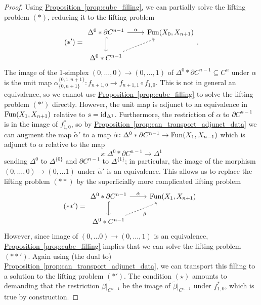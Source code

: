 \documentclass[main.tex]{subfiles}
\begin{document}
\begin{proof}
  Using \hyperref[prop:cube_filling]{Proposition~\ref*{prop:cube_filling}}, we can partially solve the lifting problem $(*)$, reducing it to the lifting problem
  \begin{equation*}
    (*') =
    \begin{tikzcd}
      \Delta^{0} \ast \partial C^{n-1}
      \arrow[r, "\alpha"]
      \arrow[d, hook]
      & \Fun(X_{0}, X_{n+1})
      \\
      \Delta^{0} \ast C^{n-1}
      \arrow[ur, dashed]
    \end{tikzcd}.
  \end{equation*}
  The image of the 1-simplex $(0, \ldots, 0) \to (0, \ldots, 1)$ of $\Delta^{0} \ast \partial C^{n-1} \subseteq C^{n}$ under $\alpha$ is the unit map $\alpha^{\{0, 1, n+1\}}_{\{0, n+1\}}\colon f_{n+1, 0} \to f_{n+1, 1} \circ f_{1, 0}$. This is not in general an equivalence, so we cannot use \hyperref[prop:cube_filling]{Proposition~\ref*{prop:cube_filling}} to solve the lifting problem $(*')$ directly. However, the unit map is adjunct to an equivalence in $\mathrm{Fun}(X_{1}, X_{n+1})$ relative to $s = \mathrm{id}_{\Delta^{1}}$. Furthermore, the restriction of $\alpha$ to $\partial C^{n-1}$ is in the image of $f^{*}_{1,0}$, so by \hyperref[prop:can_transport_adjunct_data]{Proposition~\ref*{prop:can_transport_adjunct_data}} we can augment the map $\tilde{\alpha}'$ to a map $\tilde{\alpha}\colon \Delta^{0} \ast \partial C^{n-1} \to \mathrm{Fun}(X_{1}, X_{n-1})$ which is adjunct to $\alpha$ relative to the map
  \begin{equation*}
    s\colon \Delta^{0} \ast \partial C^{n-1} \to \Delta^{1}
  \end{equation*}
  sending $\Delta^{0}$ to $\Delta^{\{0\}}$ and $\partial C^{n-1}$ to $\Delta^{\{1\}}$; in particular, the image of the morphism $(0, \ldots, 0) \to (0, \ldots 1)$ under $\tilde{\alpha}'$ is an equivalence. This allows us to replace the lifting problem $(**)$ by the superficially more complicated lifting problem
  \begin{equation*}
    (**') =
    \begin{tikzcd}
      \Delta^{0} \ast \partial C^{n-1}
      \arrow[r, "\tilde{\alpha}"]
      \arrow[d, hook]
      & \Fun(X_{1}, X_{n+1})
      \\
      \Delta^{0} \ast C^{n-1}
      \arrow[ur, dashed, swap, "\tilde{\beta}"]
    \end{tikzcd}
  \end{equation*}
  However, since image of $(0, \ldots 0) \to (0, \ldots, 1)$ is an equivalence, \hyperref[prop:cube_filling]{Proposition~\ref*{prop:cube_filling}} implies that we can solve the lifting problem $(**')$. Again using (the dual to) \hyperref[prop:can_transport_adjunct_data]{Proposition~\ref*{prop:can_transport_adjunct_data}}, we can transport this filling to a solution to the lifting problem $(*')$. The condition $(\star)$ amounts to demanding that the restriction $\beta|_{C^{n-1}}$ be the image of $\tilde{\beta}|_{C^{n-1}}$ under $f_{1,0}^{*}$, which is true by construction.
\end{proof}
\end{document}

